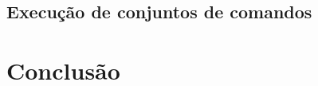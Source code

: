 \documentclass[11pt,a4paper]{report}
\begin{document}
%
%

\section{Execução de conjuntos de comandos}



\chapter{Conclusão}
\end{document}
